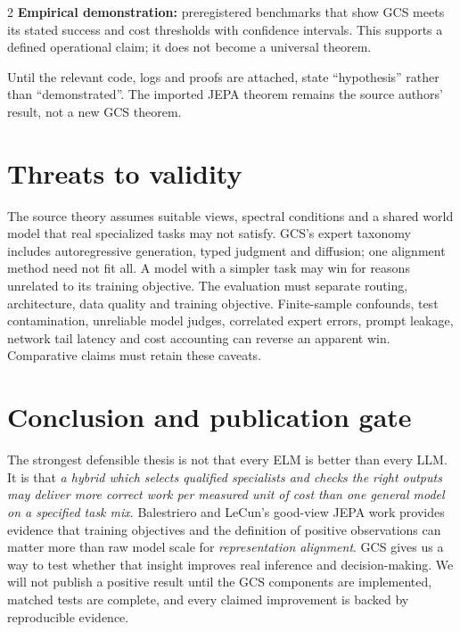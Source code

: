 \documentclass[10pt,letterpaper]{article}
\begin{document}
\begin{multicols}{2}
\textbf{Empirical demonstration:} preregistered benchmarks that show GCS meets its stated success and cost thresholds with confidence intervals. This supports a defined operational claim; it does not become a universal theorem.

Until the relevant code, logs and proofs are attached, state ``hypothesis'' rather than ``demonstrated''. The imported JEPA theorem remains the source authors' result, not a new GCS theorem.

\section{Threats to validity}
The source theory assumes suitable views, spectral conditions and a shared world model that real specialized tasks may not satisfy. GCS's expert taxonomy includes autoregressive generation, typed judgment and diffusion; one alignment method need not fit all. A model with a simpler task may win for reasons unrelated to its training objective. The evaluation must separate routing, architecture, data quality and training objective. Finite-sample confounds, test contamination, unreliable model judges, correlated expert errors, prompt leakage, network tail latency and cost accounting can reverse an apparent win. Comparative claims must retain these caveats.

\section{Conclusion and publication gate}
The strongest defensible thesis is not that every ELM is better than every LLM. It is that \emph{a hybrid which selects qualified specialists and checks the right outputs may deliver more correct work per measured unit of cost than one general model on a specified task mix}. Balestriero and LeCun's good-view JEPA work provides evidence that training objectives and the definition of positive observations can matter more than raw model scale for \emph{representation alignment}. GCS gives us a way to test whether that insight improves real inference and decision-making. We will not publish a positive result until the GCS components are implemented, matched tests are complete, and every claimed improvement is backed by reproducible evidence.

\end{multicols}
\clearpage
\end{document}

